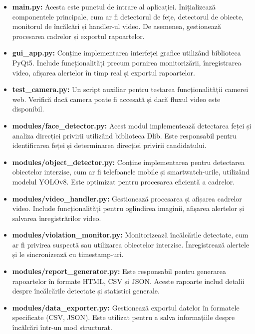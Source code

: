 \documentclass[12pt,a4paper]{article}
\begin{document}
\begin{itemize}
    \item \textbf{main.py:} Acesta este punctul de intrare al aplicației. Inițializează componentele principale, cum ar fi detectorul de fețe, detectorul de obiecte, monitorul de încălcări și handler-ul video. De asemenea, gestionează procesarea cadrelor și exportul rapoartelor.

    \item \textbf{gui\_app.py:} Conține implementarea interfeței grafice utilizând biblioteca PyQt5. Include funcționalități precum pornirea monitorizării, înregistrarea video, afișarea alertelor în timp real și exportul rapoartelor.
    
    \item \textbf{test\_camera.py:} Un script auxiliar pentru testarea funcționalității camerei web. Verifică dacă camera poate fi accesată și dacă fluxul video este disponibil.

    \item \textbf{modules/face\_detector.py:} Acest modul implementează detectarea feței și analiza direcției privirii utilizând biblioteca Dlib. Este responsabil pentru identificarea feței și determinarea direcției privirii candidatului.

    \item \textbf{modules/object\_detector.py:} Conține implementarea pentru detectarea obiectelor interzise, cum ar fi telefoanele mobile și smartwatch-urile, utilizând modelul YOLOv8. Este optimizat pentru procesarea eficientă a cadrelor.

    \item \textbf{modules/video\_handler.py:} Gestionează procesarea și afișarea cadrelor video. Include funcționalități pentru oglindirea imaginii, afișarea alertelor și salvarea înregistrărilor video.

    \item \textbf{modules/violation\_monitor.py:} Monitorizează încălcările detectate, cum ar fi privirea suspectă sau utilizarea obiectelor interzise. Înregistrează alertele și le sincronizează cu timestamp-uri.

    \item \textbf{modules/report\_generator.py:} Este responsabil pentru generarea rapoartelor în formate HTML, CSV și JSON. Aceste rapoarte includ detalii despre încălcările detectate și statistici generale.

    \item \textbf{modules/data\_exporter.py:} Gestionează exportul datelor în formatele specificate (CSV, JSON). Este utilizat pentru a salva informațiile despre încălcări într-un mod structurat.
    

\end{itemize}
\end{document}
